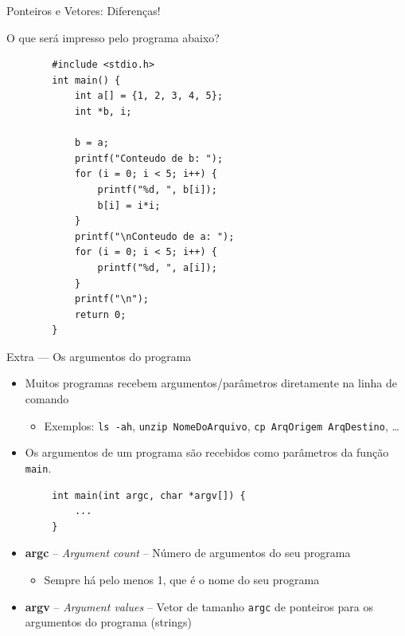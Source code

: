 \documentclass[handout]{beamer}
\newcommand{\cod}[1]{\texttt{#1}}
\begin{document}
\begin{frame}[fragile]{Ponteiros e Vetores: Diferenças!}

    O que será impresso pelo programa abaixo?

    \begin{verbatim}
        #include <stdio.h>
        int main() {
            int a[] = {1, 2, 3, 4, 5};
            int *b, i;

            b = a;
            printf("Conteudo de b: ");
            for (i = 0; i < 5; i++) {
                printf("%d, ", b[i]);
                b[i] = i*i;
            }
            printf("\nConteudo de a: ");
            for (i = 0; i < 5; i++) {
                printf("%d, ", a[i]);
            }
            printf("\n");
            return 0;
        }
    \end{verbatim}

\end{frame}


\begin{frame}[fragile]{Extra --- Os argumentos do programa}
    \begin{itemize}
        \item Muitos programas recebem argumentos/parâmetros diretamente na linha de comando
        \begin{itemize}
            \item Exemplos: \texttt{ls -ah}, \texttt{unzip NomeDoArquivo}, \texttt{cp ArqOrigem ArqDestino}, \ldots
        \end{itemize}
        \item Os argumentos de um programa são recebidos como parâmetros da função \cod{main}.
    \end{itemize}
    \begin{verbatim}
        int main(int argc, char *argv[]) {
            ...
        }
    \end{verbatim}
    \begin{itemize}
        \item \textbf{argc} -- \emph{Argument count} -- Número de argumentos do seu programa
        \begin{itemize}
            \item Sempre há pelo menos 1, que é o nome do seu programa
        \end{itemize}
        \item \textbf{argv} -- \emph{Argument values} -- Vetor de
        tamanho \cod{argc} de ponteiros para os argumentos do programa
        (strings)
    \end{itemize}
\end{frame}
\end{document}
